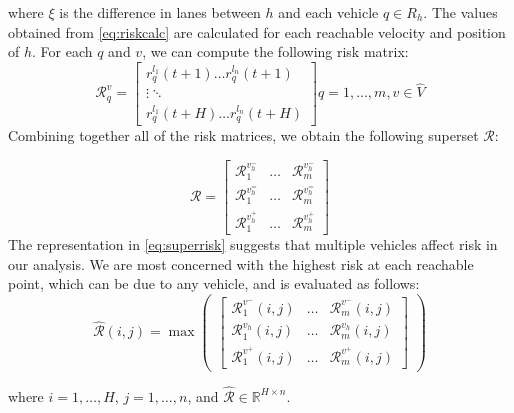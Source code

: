 \documentclass[letterpaper, 10 pt, conference]{ieeeconf}  %
\newcommand\NB[1]{$\spadesuit$\footnote{NB: #1}}
\begin{document}
where $\xi$ is the difference in lanes between $h$ and each vehicle $q\in R_h$.
 The values obtained from \eqref{eq:riskcalc} are calculated for each reachable velocity and position of $h$. For each $q$ and $v$, we can compute the following risk matrix: %
\begin{equation} \label{eq:riskmat}
\mathcal{R}_{q}^{v}=
\begin{bmatrix}
r_q^{l_1}(t+1)  \dots  r_q^{l_n}(t+1) \\
\vdots  \ddots  \\
r_q^{l_1}(t+H)  \dots   r_q^{l_n}(t+H)
\end{bmatrix} q = 1,\ldots,m,v\in\hat{V}
\end{equation}
Combining together all of the risk matrices, we obtain the following superset $\mathcal{R}$:

\begin{equation} \label{eq:superrisk}
\mathcal{R} =
\begin{bmatrix}
\mathcal{R}_{1}^{v_h^-} & \ldots & \mathcal{R}_{m}^{v_h^-} \\
\mathcal{R}_{1}^{v_h^=} & \ldots & \mathcal{R}_{m}^{v_h^=} \\
\mathcal{R}_{1}^{v_h^+} & \ldots   & \mathcal{R}_{m}^{v_h^+}
\end{bmatrix}
\end{equation}
The representation in \eqref{eq:superrisk} suggests that multiple vehicles affect risk in our analysis. We are most concerned with the highest risk at each reachable point, which can be due to any vehicle, and is evaluated as follows: %
\begin{equation} \label{eq:riskdistribution}
 \hat{\mathcal{R}}(i,j) = \max\begin{pmatrix}
 \begin{bmatrix}
\mathcal{R}_{1}^{v^-}(i,j) & \ldots & \mathcal{R}_{m}^{v^-}(i,j) \\
\mathcal{R}_{1}^{v_h}(i,j) & \ldots & \mathcal{R}_{m}^{v_h}(i,j) \\
\mathcal{R}_{1}^{v^+}(i,j) & \ldots   & \mathcal{R}_{m}^{v^+}(i,j)
\end{bmatrix}\end{pmatrix}
\end{equation}

 where $i = 1,\ldots,H$, $j = 1,\ldots,n$, and $\hat{\mathcal{R}} \in \mathbb{R}^{H\times n}$.
 
\end{document}
